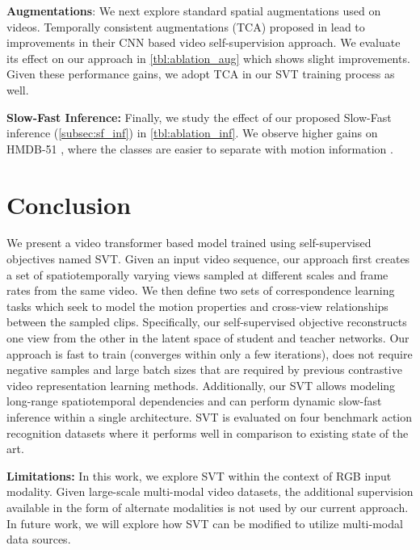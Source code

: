 \documentclass[10pt,twocolumn,letterpaper]{article}
\begin{document}
\vspace{0.1em}
\noindent\textbf{Augmentations}: We next explore standard spatial augmentations used on videos.
Temporally consistent augmentations (TCA) proposed in \cite{qian2020spatiotemporal} lead to improvements in their CNN based video self-supervision approach. We evaluate its effect on our approach in \cref{tbl:ablation_aug} which shows slight improvements. Given these performance gains, we adopt TCA in our SVT training process as well.

\vspace{0.1em}
\noindent\textbf{Slow-Fast Inference:} Finally, we study the effect of our proposed Slow-Fast inference (\cref{subsec:sf_inf}) in \cref{tbl:ablation_inf}. We observe higher gains on  HMDB-51 \cite{kuehne2011hmdb}, where the classes are easier to separate with motion information \cite{han2020self}. 

%
 \section{Conclusion}
\label{sec:conclusion}
We present a video transformer based model trained using self-supervised objectives named SVT. Given an input video sequence, our approach first creates a set of spatiotemporally varying views sampled at different scales and frame rates from the same video. We then define two sets of correspondence learning tasks which seek to model the motion properties and cross-view relationships between the sampled clips. Specifically, our self-supervised objective reconstructs one view from the other in the latent space of student and teacher networks. Our approach is fast to train (converges within only a few iterations), does not require negative samples and large batch sizes that are required by previous contrastive video representation  learning methods. Additionally, our SVT  allows modeling long-range spatiotemporal dependencies and can perform dynamic slow-fast inference within a single architecture. SVT is evaluated on four benchmark action recognition datasets where it performs well in comparison to existing state of the art. 

\textbf{Limitations:}
In this work, we explore SVT within the context of RGB input modality. Given large-scale multi-modal video datasets, the additional supervision available in the form of alternate modalities is not used by our current approach. In future work, we will explore how SVT can be modified to utilize multi-modal data sources. 


{\small


}
\end{document}
